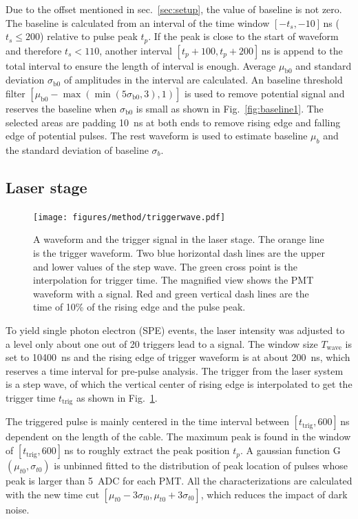 Due to the offset mentioned in sec.~\ref{sec:setup}, the value of baseline is not zero. The baseline is calculated from an interval of the time window $[-t_s,-10]$\,ns ($t_s\leq200$) relative to pulse peak $t_p$. If the peak is close to the start of waveform and therefore $t_s < 110$, another interval $[t_p+100,t_p+200]$\,ns is append to the total interval to ensure the length of interval is enough. Average $\mu_{\mathrm{b0}}$ and standard deviation $\sigma_{\mathrm{b0}}$ of amplitudes in the interval are calculated. An baseline threshold filter $[\mu_{\mathrm{b0}}-\max(\min(5\sigma_{\mathrm{b0}},3),1)]$ is used to remove potential signal and reserves the baseline when $\sigma_{\mathrm{b0}}$ is small as shown in Fig.~\ref{fig:baseline1}. The selected areas are padding \SI{10}{ns} at both ends to remove rising edge and falling edge of potential pulses. The rest waveform is used to estimate baseline $\mu_b$ and the standard deviation of baseline $\sigma_b$.

\subsection{Laser stage}
\label{sec:laserstage}

\begin{figure}[!htbp]
    \centering
    \texttt{[image: figures/method/triggerwave.pdf]}
    \caption{A waveform and the trigger signal in the laser stage. The orange line is the trigger waveform. Two blue horizontal dash lines are the upper and lower values of the step wave. The green cross point is the interpolation for trigger time. The magnified view shows the PMT waveform with a signal. Red and green vertical dash lines are the time of 10\% of the rising edge and the pulse peak.}
    \label{fig:triggertime}
\end{figure}

To yield single photon electron (SPE) events, the laser intensity was adjusted to a level only about one out of 20 triggers lead to a signal. The window size $T_{\mathrm{wave}}$ is set to \SI{10400}{ns} and the rising edge of trigger waveform is at about \SI{200}{ns}, which reserves a time interval for pre-pulse analysis. The trigger from the laser system is a step wave, of which the vertical center of rising edge is interpolated to get the trigger time $t_{\mathrm{trig}}$ as shown in Fig.~\ref{fig:triggertime}.

The triggered pulse is mainly centered in the time interval between $[t_{\mathrm{trig}}, 600]$\,ns dependent on the length of the cable. The maximum peak is found in the window of $[t_{\mathrm{trig}}, 600]$\,ns to roughly extract the peak position $t_p$. A gaussian function G$(\mu_{t0},\sigma_{t0})$ is unbinned fitted to the distribution of peak location of pulses whose peak is larger than \SI{5}{ADC} for each PMT. %
 All the characterizations are calculated with the new time cut $[\mu_{t0}-3\sigma_{t0}, \mu_{t0}+3\sigma_{t0}]$, which reduces the impact of dark noise.

